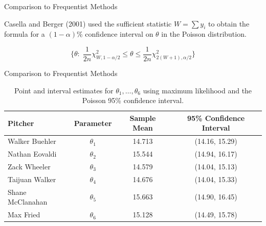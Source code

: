 \documentclass[xcolor=dvipsnames]{beamer}
\begin{document}

\begin{frame}{Comparison to Frequentist Methods}

Casella and Berger (2001) used the sufficient statistic $W=\sum y_i$ to obtain the formula for a $(1-\alpha)$\% confidence interval on $\theta$ in the Poisson distribution.

\begin{equation*}
    \Big\{ \theta: \; \frac{1}{2n}\chi^2_{W,1-\alpha/2} \leq \theta \leq 
    \frac{1}{2n} \chi^2_{2(W+1),\alpha/2} \Big\}
\end{equation*}

\end{frame}


\begin{frame}{Comparison to Frequentist Methods}

\begin{table}[h]
    \centering
    \begin{tabular}{lccc}
         \hline
         Pitcher & Parameter & Sample Mean & 95\% Confidence Interval \\
         \hline
         Walker Buehler & $\theta_1$ & 14.713 & (14.16, 15.29) \\
         Nathan Eovaldi & $\theta_2$ &  15.544 & (14.94, 16.17) \\
         Zack Wheeler & $\theta_3$ & 14.579 & (14.04, 15.13) \\
         Taijuan Walker & $\theta_4$ & 14.676 & (14.04, 15.33) \\
         Shane McClanahan & $\theta_5$ & 15.663 & (14.90, 16.45) \\
         Max Fried & $\theta_6$ & 15.128 & (14.49, 15.78) \\
         \hline
    \end{tabular}
    \caption{Point and interval estimates for $\theta_1, \hdots, \theta_6$ using maximum likelihood and the Poisson 95\% confidence interval.}
\end{table}

\end{frame}

\end{document}
